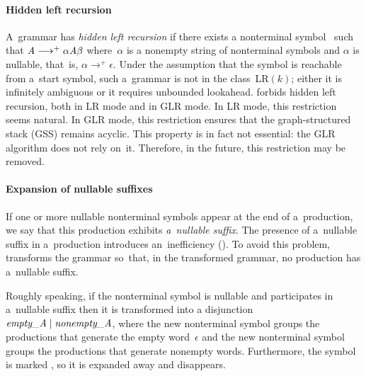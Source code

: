 \paragraph{Hidden left recursion}

A~grammar has \emph{hidden left recursion}
if there exists a nonterminal symbol~
such that $\textit{A} \longrightarrow^+ \alpha\textit{A}\beta$
where~$\alpha$ is a nonempty string of nonterminal symbols
and $\alpha$ is nullable,
that~is, $\alpha \longrightarrow^+ \epsilon$.
%
Under the assumption that the symbol  is reachable
from a~start symbol,
such a~grammar is not in the class~LR$(k)$;
either it is infinitely ambiguous
or it requires unbounded lookahead.
%
%
\menhir forbids hidden left recursion,
both in LR mode and in GLR mode.
%
In LR mode, this restriction seems natural.
%
In GLR mode,
this restriction ensures that
the graph-structured stack (GSS)
remains acyclic.
%
This property is in fact not essential:
the GLR algorithm does not rely on~it.
%
%
Therefore, in the future,
this restriction may be removed.

\paragraph{Expansion of nullable suffixes}
\label{sec:GLR:expansion}

If one or more nullable nonterminal symbols
appear at the end of a~production,
we say that this production exhibits \emph{a~nullable suffix}.
%
The presence of a~nullable suffix in a~production
introduces an~inefficiency ().
%
To avoid this problem,
\menhir transforms the grammar
so~that,
in the transformed grammar,
no production has a~nullable suffix.

Roughly speaking,
if the nonterminal symbol  is nullable
and participates in a~nullable suffix
then it is transformed into
a disjunction $\textit{empty\_A} \mid \textit{nonempty\_A}$,
where
the new nonterminal symbol 
groups the productions that generate the empty word~$\epsilon$
and
the new nonterminal symbol 
groups the productions that generate nonempty words.
%
Furthermore, the symbol  is marked \dinline,
so it is expanded away and disappears.

